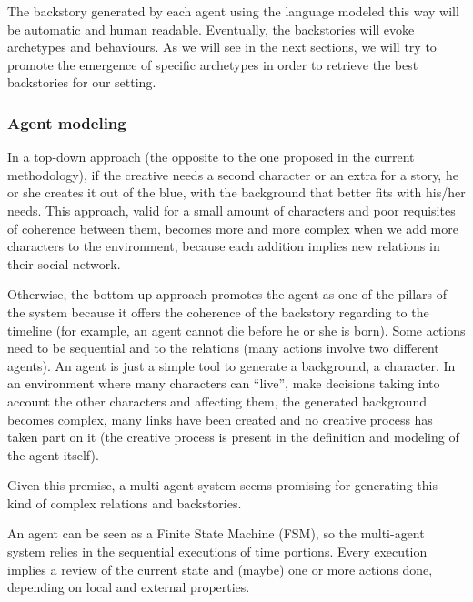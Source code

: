 \documentclass[letterpaper]{article}
\begin{document}
The backstory generated by each agent using the language modeled this way will be automatic and human readable. Eventually, the backstories will evoke archetypes and behaviours. As we will see in the next sections, we will try to promote the emergence of specific archetypes in order to retrieve the best backstories for our setting.



\subsubsection{Agent modeling}


In a top-down approach (the opposite to the one proposed in the current methodology), if the creative needs a second character or an extra for a story, he or she creates it out of the blue, with the background that better fits with his/her needs. This approach, valid for a small amount of characters and poor requisites of coherence between them, becomes more and more complex when we add more characters to the environment, because each addition implies new relations in their social network.


Otherwise, the bottom-up approach promotes the agent as one of the pillars of the system because it offers the coherence of the backstory regarding to the timeline (for example, an agent cannot die before he or she is born). Some actions need to be sequential and to the relations (many actions involve two different agents). An agent is just a simple tool to generate a background, a character. In an environment where many characters can ``live'', make decisions taking into account the other characters and affecting them, the generated background becomes complex, many links have been created and no creative process has taken part on it (the creative process is present in the definition and modeling of the agent itself).

Given this premise, a multi-agent system seems promising for generating this kind of complex relations and backstories.



An agent can be seen as a Finite State Machine (FSM), so the multi-agent system relies in the sequential executions of time portions. Every execution implies a review of the current state and (maybe) one or more actions done, depending on local and external properties.\\
\end{document}
